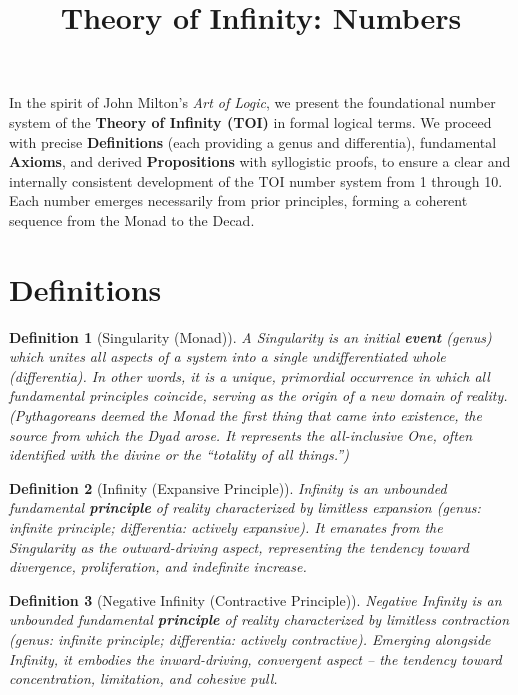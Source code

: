 \documentclass[11pt]{article}
\newtheorem{definition}{Definition}
\theoremstyle{plain}
\begin{document}
\title{\Huge Theory of Infinity: Numbers}
\author{}
\date{}
\maketitle



In the spirit of John Milton’s \textit{Art of Logic}, we present the foundational number system of the \textbf{Theory of Infinity (TOI)} in formal logical terms. We proceed with precise \textbf{Definitions} (each providing a genus and differentia), fundamental \textbf{Axioms}, and derived \textbf{Propositions} with syllogistic proofs, to ensure a clear and internally consistent development of the TOI number system from 1 through 10. Each number emerges necessarily from prior principles, forming a coherent sequence from the Monad to the Decad.

\section{Definitions}

\begin{definition}[Singularity (Monad)]
A \emph{Singularity} is an initial \textbf{event} \textit{(genus)} which unites all aspects of a system into a single undifferentiated whole \textit{(differentia)}. In other words, it is a unique, primordial occurrence in which all fundamental principles coincide, serving as the origin of a new domain of reality. \textit{(Pythagoreans deemed the Monad the first thing that came into existence, the source from which the Dyad arose. It represents the all-inclusive One, often identified with the divine or the “totality of all things.”)}
\end{definition}

\begin{definition}[Infinity (Expansive Principle)]
\emph{Infinity} is an unbounded fundamental \textbf{principle} of reality characterized by limitless expansion \textit{(genus: infinite principle; differentia: actively expansive)}. It emanates from the Singularity as the outward-driving aspect, representing the tendency toward divergence, proliferation, and indefinite increase.
\end{definition}

\begin{definition}[Negative Infinity (Contractive Principle)]
\emph{Negative Infinity} is an unbounded fundamental \textbf{principle} of reality characterized by limitless contraction \textit{(genus: infinite principle; differentia: actively contractive)}. Emerging alongside Infinity, it embodies the inward-driving, convergent aspect – the tendency toward concentration, limitation, and cohesive pull.
\end{definition}
\end{document}
